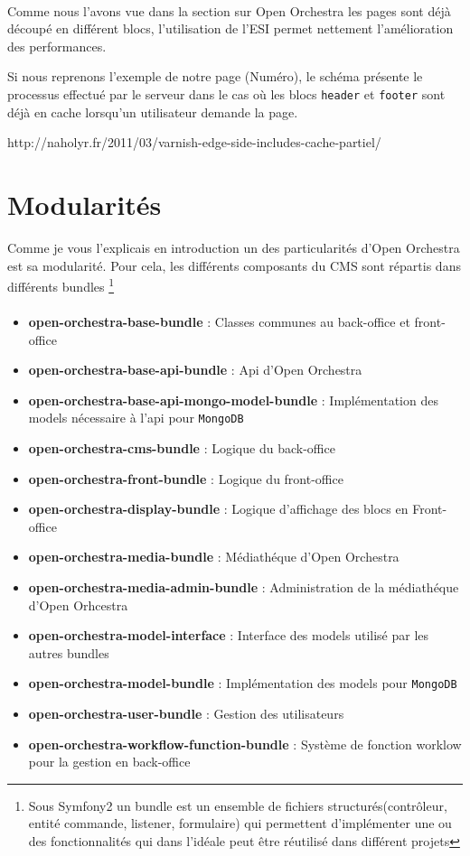    \paragraph{}
   Comme nous l'avons vue dans la section sur Open Orchestra les pages sont déjà découpé en différent blocs, l'utilisation de l'ESI permet nettement l'amélioration des performances.

   Si nous reprenons l'exemple de notre page (Numéro), le schéma présente le processus effectué par le serveur dans le cas où les blocs \verb?header? et \verb?footer? sont déjà en cache lorsqu'un utilisateur demande la page.

   http://naholyr.fr/2011/03/varnish-edge-side-includes-cache-partiel/
   
   \section{Modularités}
   Comme je vous l'explicais en introduction un des particularités d'Open Orchestra est sa modularité. Pour cela, les différents composants du CMS sont répartis dans différents bundles \footnote{Sous Symfony2 un bundle est un ensemble de fichiers structurés(contrôleur, entité commande, listener, formulaire) qui permettent d'implémenter une ou des fonctionnalités qui dans l'idéale peut être réutilisé dans différent projets}
   \paragraph{}
   \begin{itemize}
   \item \textbf{open-orchestra-base-bundle} : Classes communes au back-office et front-office
   \item \textbf{open-orchestra-base-api-bundle} : Api d'Open Orchestra
   \item \textbf{open-orchestra-base-api-mongo-model-bundle} : Implémentation des models nécessaire à l'api pour \verb?MongoDB? 
   \item \textbf{open-orchestra-cms-bundle} : Logique du back-office
   \item \textbf{open-orchestra-front-bundle} : Logique du front-office
   \item \textbf{open-orchestra-display-bundle} : Logique d'affichage des blocs en Front-office
   \item \textbf{open-orchestra-media-bundle} : Médiathéque d'Open Orchestra
   \item \textbf{open-orchestra-media-admin-bundle} : Administration de la médiathéque d'Open Orhcestra
   \item \textbf{open-orchestra-model-interface} : Interface des models utilisé par les autres bundles 
   \item \textbf{open-orchestra-model-bundle} : Implémentation des models pour \verb?MongoDB? 
   \item \textbf{open-orchestra-user-bundle} : Gestion des utilisateurs 
   \item \textbf{open-orchestra-workflow-function-bundle} : Système de fonction worklow pour la gestion en back-office 
   \end{itemize}
